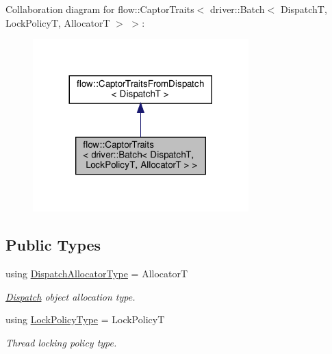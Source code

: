 Collaboration diagram for flow\+:\+:Captor\+Traits$<$ driver\+:\+:Batch$<$ DispatchT, Lock\+PolicyT, AllocatorT $>$ $>$\+:\nopagebreak
\begin{figure}[H]
\begin{center}
\leavevmode
\includegraphics[width=236pt]{structflow_1_1_captor_traits_3_01driver_1_1_batch_3_01_dispatch_t_00_01_lock_policy_t_00_01_allocator_t_01_4_01_4__coll__graph}
\end{center}
\end{figure}
\subsection*{Public Types}
\begin{DoxyCompactItemize}
\item 
\mbox{\label{structflow_1_1_captor_traits_3_01driver_1_1_batch_3_01_dispatch_t_00_01_lock_policy_t_00_01_allocator_t_01_4_01_4_ab4bba7b8afb03281d563e9a2dcbc10f1}} 
using \hyperlink{structflow_1_1_captor_traits_3_01driver_1_1_batch_3_01_dispatch_t_00_01_lock_policy_t_00_01_allocator_t_01_4_01_4_ab4bba7b8afb03281d563e9a2dcbc10f1}{Dispatch\+Allocator\+Type} = AllocatorT
\begin{DoxyCompactList}\small\item\em \hyperlink{classflow_1_1_dispatch}{Dispatch} object allocation type. \end{DoxyCompactList}\item 
\mbox{\label{structflow_1_1_captor_traits_3_01driver_1_1_batch_3_01_dispatch_t_00_01_lock_policy_t_00_01_allocator_t_01_4_01_4_a94f9288b10b5252e99efb3abac212c06}} 
using \hyperlink{structflow_1_1_captor_traits_3_01driver_1_1_batch_3_01_dispatch_t_00_01_lock_policy_t_00_01_allocator_t_01_4_01_4_a94f9288b10b5252e99efb3abac212c06}{Lock\+Policy\+Type} = Lock\+PolicyT
\begin{DoxyCompactList}\small\item\em Thread locking policy type. \end{DoxyCompactList}\end{DoxyCompactItemize}


